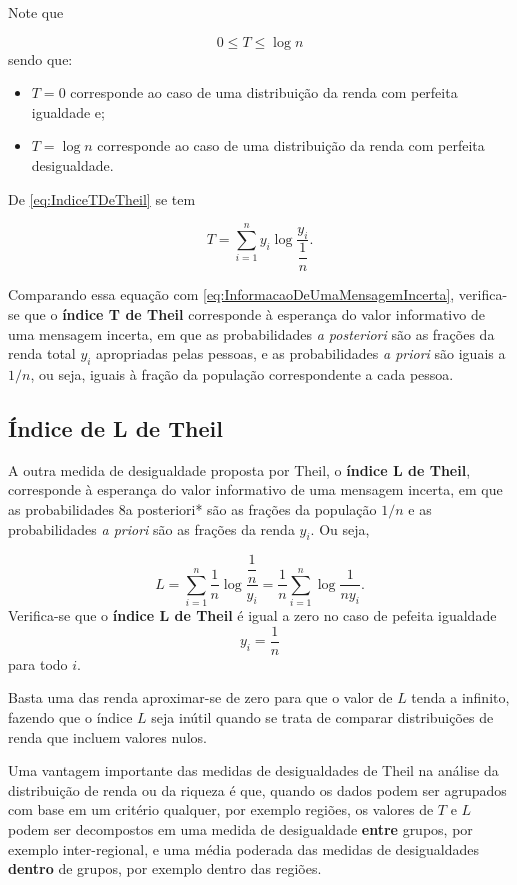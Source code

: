 \documentclass[
]{book}
\begin{document}
Note que

\[
  0 \leq T \leq \log n
  \label{eq:IntervaloDoIndiceTDeTheil}
\]
sendo que:

\begin{itemize}
\item
  \(T = 0\) corresponde ao caso de uma distribuição da renda com perfeita igualdade e;
\item
  \(T = \log n\) corresponde ao caso de uma distribuição da renda com perfeita desigualdade.
\end{itemize}

De \eqref{eq:IndiceTDeTheil} se tem

\[
  T = \sum_{i=1}^{n}y_i \log \dfrac{y_i}{\dfrac{1}{n}}.
\]

Comparando essa equação com \eqref{eq:InformacaoDeUmaMensagemIncerta}, verifica-se que o \textbf{índice T de Theil} corresponde à esperança do valor informativo de uma mensagem incerta, em que as probabilidades \emph{a posteriori} são as frações da renda total \(y_i\) apropriadas pelas pessoas, e as probabilidades \emph{a priori} são iguais a \(1/n\), ou seja, iguais à fração da população correspondente a cada pessoa.

\hypertarget{uxedndice-de-l-de-theil}{%
\subsection{Índice de L de Theil}\label{uxedndice-de-l-de-theil}}

A outra medida de desigualdade proposta por Theil, o \textbf{índice L de Theil}, corresponde à esperança do valor informativo de uma mensagem incerta, em que as probabilidades 8a posteriori* são as frações da população \(1/n\) e as probabilidades \emph{a priori} são as frações da renda \(y_i\). Ou seja,

\[
  L = \sum_{i=1}^{n}\dfrac{1}{n} \log \dfrac{\dfrac{1}{n}}{y_i} = \dfrac{1}{n}\sum_{i=1}^{n} \log \dfrac{1}{ny_i}.
  \label{eq:IndiceLDeTheil}
\]
Verifica-se que o \textbf{índice L de Theil} é igual a zero no caso de pefeita igualdade
\[
  y_i = \dfrac{1}{n}
\]
para todo \(i\).

Basta uma das renda aproximar-se de zero para que o valor de \(L\) tenda a infinito, fazendo que o índice \(L\) seja inútil quando se trata de comparar distribuições de renda que incluem valores nulos.

Uma vantagem importante das medidas de desigualdades de Theil na análise da distribuição de renda ou da riqueza é que, quando os dados podem ser agrupados com base em um critério qualquer, por exemplo regiões, os valores de \(T\) e \(L\) podem ser decompostos em uma medida de desigualdade \textbf{entre} grupos, por exemplo inter-regional, e uma média poderada das medidas de desigualdades \textbf{dentro} de grupos, por exemplo dentro das regiões.
\end{document}
